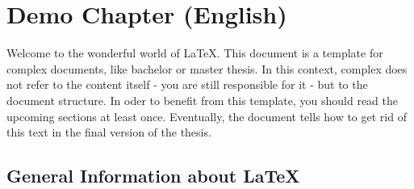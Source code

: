 %
%
%
\chapter{Demo Chapter (English)}
%
Welcome to the wonderful world of \LaTeX{}.
This document is a template for complex documents, like bachelor
or master thesis.
In this context, complex does not refer to the content itself -
you are still responsible for it - but to the document structure.
In oder to benefit from this template, you should read the upcoming
sections at least once.
Eventually, the document tells how to get rid of this text in the final
version of the thesis.
%
\section{General Information about \LaTeX{}}
%
